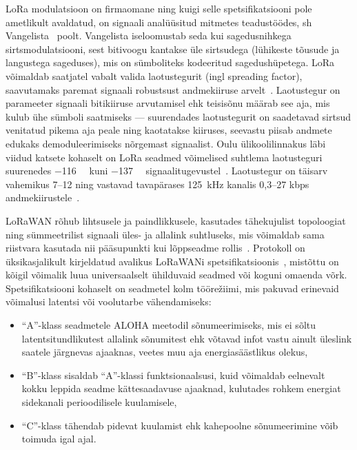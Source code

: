 \documentclass[12pt]{article}
\begin{document}
LoRa modulatsioon on firmaomane ning kuigi selle spetsifikatsiooni pole ametlikult avaldatud, on signaali analüüsitud mitmetes teadustöödes, sh Vangelista~\cite{vangelista} poolt.
Vangelista iseloomustab seda kui sagedusnihkega sirtsmodulatsiooni, sest bitivoogu kantakse üle sirtsudega (lühikeste tõusude ja langustega sageduses), mis on sümboliteks kodeeritud sagedushüpetega.
LoRa võimaldab saatjatel vabalt valida laotustegurit (ingl spreading factor), saavutamaks paremat signaali robustsust andmekiiruse arvelt~\cite{loramodulation}.
Laotustegur on parameeter signaali bitikiiruse arvutamisel ehk teisisõnu määrab see aja, mis kulub ühe sümboli saatmiseks — suurendades laotustegurit on saadetavad sirtsud venitatud pikema aja peale ning kaotatakse kiiruses, seevastu piisab andmete edukaks demoduleerimiseks nõrgemast signaalist.
Oulu ülikoolilinnakus läbi viidud katsete kohaselt on LoRa seadmed võimelised suhtlema laotusteguri suurenedes \SI{-116}{\deci\belm} kuni \SI{-137}{\deci\belm} signaalitugevustel~\cite{petajajarvi}.
Laotustegur on täisarv vahemikus 7--12 ning vastavad tavapärases \SI{125}{\kilo\hertz} kanalis 0,3--27 kbps andmekiirustele~\cite{adelanto}.

LoRaWAN rõhub lihtsusele ja paindlikkusele, kasutades tähekujulist topoloogiat ning sümmeetrilist signaali üles- ja allalink suhtluseks, mis võimaldab sama riistvara kasutada nii pääsupunkti kui lõppseadme rollis~\cite{lorawanIntro}.
Protokoll on üksikasjalikult kirjeldatud avalikus LoRaWANi spetsifikatsioonis~\cite{lorawanspec}, mistõttu on kõigil võimalik luua universaalselt ühilduvaid seadmed või koguni omaenda võrk.
Spetsifikatsiooni kohaselt on seadmetel kolm töörežiimi, mis pakuvad erinevaid võimalusi latentsi või voolutarbe vähendamiseks:
\begin{itemize}
    \item “A”-klass seadmetele ALOHA meetodil sõnumeerimiseks, mis ei sõltu latentsitundlikutest allalink sõnumitest ehk võtavad infot vastu ainult üleslink saatele järgnevas ajaaknas, veetes muu aja energiasäästlikus olekus,
    \item “B”-klass sisaldab “A”-klassi funktsionaalsusi, kuid võimaldab eelnevalt kokku leppida seadme kättesaadavuse ajaaknad, kulutades rohkem energiat sidekanali perioodilisele kuulamisele,
    \item “C”-klass tähendab pidevat kuulamist ehk kahepoolne sõnumeerimine võib toimuda igal ajal.
\end{itemize}
\end{document}
